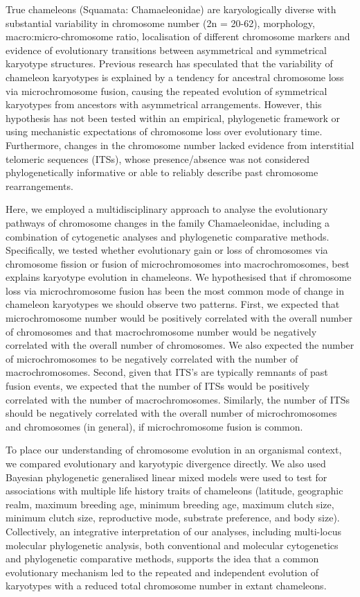 \documentclass[a4paper, 12pt]{article}
\begin{document}
True chameleons (Squamata: Chamaeleonidae) are karyologically diverse with substantial variability in chromosome number (2n = 20-62), morphology, macro:micro-chromosome ratio, localisation of different chromosome markers and evidence of evolutionary transitions between asymmetrical and symmetrical karyotype structures\cite{rovatsos2017evolution,nielsen2018dynamic}.
Previous research has speculated that the variability of chameleon karyotypes is explained by a tendency for ancestral chromosome loss via microchromosome fusion\cite{rovatsos2017evolution}, causing the repeated evolution of symmetrical karyotypes from ancestors with asymmetrical arrangements. 
However, this hypothesis has not been tested within an empirical, phylogenetic framework or using mechanistic expectations of chromosome loss over evolutionary time. 
Furthermore, changes in the chromosome number lacked evidence from interstitial telomeric sequences (ITSs), whose presence/absence was not considered phylogenetically informative or able to reliably describe past chromosome rearrangements\cite{rovatsos2017evolution}.

Here, we employed a multidisciplinary approach to analyse the evolutionary pathways of chromosome changes in the family Chamaeleonidae, including a combination of cytogenetic analyses and phylogenetic comparative methods. 
Specifically, we tested whether evolutionary gain or loss of chromosomes via chromosome fission or fusion of microchromosomes into macrochromosomes, best explains karyotype evolution in chameleons. 
We hypothesised that if chromosome loss via microchromosome fusion has been the most common mode of change in chameleon karyotypes we should observe two patterns. 
First, we expected that microchromosome number would be positively correlated with the overall number of chromosomes and that macrochromosome number would be negatively correlated with the overall number of chromosomes. 
We also expected the number of microchromosomes to be negatively correlated with the number of macrochromosomes. 
Second, given that ITS’s are typically remnants of past fusion events\cite{bolzan2017interstitial}, we expected that the number of ITSs would be positively correlated with the number of macrochromosomes. 
Similarly, the number of ITSs should be negatively correlated with the overall number of microchromosomes and chromosomes (in general), if microchromosome fusion is common. 

To place our understanding of chromosome evolution in an organismal context, we compared evolutionary and karyotypic divergence directly. 
We also used Bayesian phylogenetic generalised linear mixed models were used to test for associations with multiple life history traits of chameleons (latitude, geographic realm, maximum breeding age, minimum breeding age, maximum clutch size, minimum clutch size, reproductive mode, substrate preference, and body size). 
Collectively, an integrative interpretation of our analyses, including multi-locus molecular phylogenetic analysis, both conventional and molecular cytogenetics and phylogenetic comparative methods, supports the idea that a common evolutionary mechanism led to the repeated and independent evolution of karyotypes with a reduced total chromosome number in extant chameleons.
\end{document}
